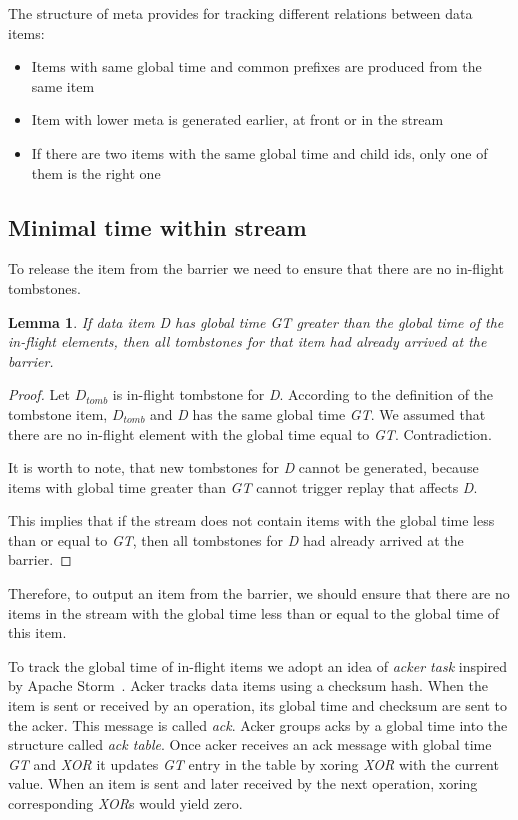 The structure of meta provides for tracking different relations between data items:

\begin{itemize}
  \item Items with same global time and common prefixes are produced from the same item
  \item Item with lower meta is generated earlier, at front or in the stream
  \item If there are two items with the same global time and child ids, only one of them is the right one
\end{itemize}

\label{mininal-time}
\subsection{Minimal time within stream}

To release the item from the barrier we need to ensure that there are no in-flight tombstones. 

\newtheorem{minimal-time-claim}{Lemma}

\begin{minimal-time-claim}
  If data item {\it D} has global time {\it GT} greater than the global time of the in-flight elements, then all tombstones for that item had already arrived at the barrier.
\end{minimal-time-claim}

\begin{proof}
  Let $D_{tomb}$ is in-flight tombstone for {\it D}. According to the definition of the tombstone item, $D_{tomb}$ and {\it D} has the same global time {\it GT}. We assumed that there are no in-flight element with the global time equal to {\it GT}. Contradiction.
  
  It is worth to note, that new tombstones for {\it D} cannot be generated, because items with global time greater than {\it GT} cannot trigger replay that affects {\it D}.

  This implies that if the stream does not contain items with the global time less than or equal to {\it GT}, then all tombstones for {\it D} had already arrived at the barrier. 
\end{proof}

Therefore, to output an item from the barrier, we should ensure that there are no items in the stream with the global time less than or equal to the global time of this item.

To track the global time of in-flight items we adopt an idea of {\it acker task} inspired by Apache Storm~\cite{apache:storm}. Acker tracks data items using a checksum hash. When the item is sent or received by an operation, its global time and checksum are sent to the acker. This message is called {\it ack}. Acker groups acks by a global time into the structure called {\it ack table}. Once acker receives an ack message with global time {\it GT} and {\it XOR} it updates {\it GT} entry in the table by xoring {\it XOR} with the current value. When an item is sent and later received by the next operation, xoring corresponding {\it XOR}s would yield zero.

